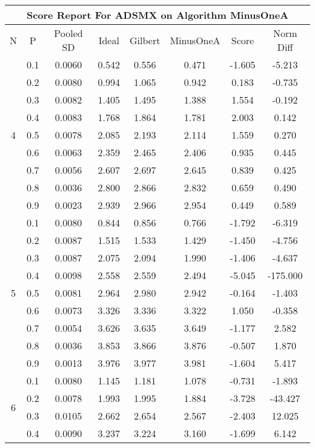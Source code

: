 \documentclass[11pt,a4paper]{report}
\begin{document}
\begin{longtable}{ | c | c || c | c | c | c | c | c | }
\hline
\multicolumn{8}{|c|}{ Score Report For ADSMX on Algorithm MinusOneA} \\
\hline
N & P & Pooled SD &  Ideal &  Gilbert & MinusOneA  & Score & Norm Diff \\
 \hline
 \hline
 \endhead
\multirow{9}{*}{4} & 0.1 & 0.0060 & 0.542 & 0.556 & 0.471 & -1.605 & -5.213 \\
 & 0.2 & 0.0080 & 0.994 & 1.065 & 0.942 & 0.183 & -0.735 \\
 & 0.3 & 0.0082 & 1.405 & 1.495 & 1.388 & 1.554 & -0.192 \\
 & 0.4 & 0.0083 & 1.768 & 1.864 & 1.781 & 2.003 & 0.142 \\
 & 0.5 & 0.0078 & 2.085 & 2.193 & 2.114 & 1.559 & 0.270 \\
 & 0.6 & 0.0063 & 2.359 & 2.465 & 2.406 & 0.935 & 0.445 \\
 & 0.7 & 0.0056 & 2.607 & 2.697 & 2.645 & 0.839 & 0.425 \\
 & 0.8 & 0.0036 & 2.800 & 2.866 & 2.832 & 0.659 & 0.490 \\
 & 0.9 & 0.0023 & 2.939 & 2.966 & 2.954 & 0.449 & 0.589 \\
 \hline
\multirow{9}{*}{5} & 0.1 & 0.0080 & 0.844 & 0.856 & 0.766 & -1.792 & -6.319 \\
 & 0.2 & 0.0087 & 1.515 & 1.533 & 1.429 & -1.450 & -4.756 \\
 & 0.3 & 0.0087 & 2.075 & 2.094 & 1.990 & -1.406 & -4.637 \\
 & 0.4 & 0.0098 & 2.558 & 2.559 & 2.494 & -5.045 & -175.000 \\
 & 0.5 & 0.0081 & 2.964 & 2.980 & 2.942 & -0.164 & -1.403 \\
 & 0.6 & 0.0073 & 3.326 & 3.336 & 3.322 & 1.050 & -0.358 \\
 & 0.7 & 0.0054 & 3.626 & 3.635 & 3.649 & -1.177 & 2.582 \\
 & 0.8 & 0.0036 & 3.853 & 3.866 & 3.876 & -0.507 & 1.870 \\
 & 0.9 & 0.0013 & 3.976 & 3.977 & 3.981 & -1.604 & 5.417 \\
 \hline
\multirow{9}{*}{6} & 0.1 & 0.0080 & 1.145 & 1.181 & 1.078 & -0.731 & -1.893 \\
 & 0.2 & 0.0078 & 1.993 & 1.995 & 1.884 & -3.728 & -43.427 \\
 & 0.3 & 0.0105 & 2.662 & 2.654 & 2.567 & -2.403 & 12.025 \\
 & 0.4 & 0.0090 & 3.237 & 3.224 & 3.160 & -1.699 & 6.142 \\

\end{longtable}
\end{document}
